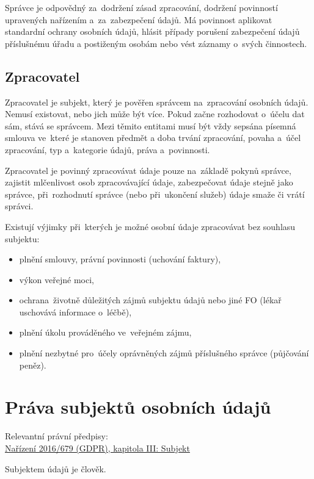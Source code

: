 Správce je odpovědný za~dodržení zásad zpracování, dodržení povinností upravených nařízením a~za~zabezpečení údajů.
Má povinnost aplikovat standardní ochrany osobních údajů, hlásit případy porušení zabezpečení údajů příslušnému úřadu a postiženým osobám nebo vést záznamy o~svých činnostech.


\subsection{Zpracovatel}

Zpracovatel je subjekt, který je pověřen správcem na~zpracování osobních údajů.
Nemusí existovat, nebo jich může být více.
Pokud začne rozhodovat o~účelu dat sám, stává se správcem.
Mezi těmito entitami musí být vždy sepsána písemná smlouva ve~které je stanoven předmět a doba trvání zpracování, povaha a~účel zpracování, typ a~kategorie údajů, práva a~povinnosti.

Zpracovatel je povinný zpracovávat údaje pouze na~základě pokynů správce, zajistit mlčenlivost osob zpracovávající údaje, zabezpečovat údaje stejně jako správce, při~rozhodnutí správce (nebo při~ukončení služeb) údaje smaže či vrátí správci.

Existují výjimky při~kterých je možné osobní údaje zpracovávat bez souhlasu subjektu:
\begin{itemize}
    \item plnění smlouvy, právní povinnosti (uchování faktury),
    \item výkon veřejné moci,
    \item ochrana~životně důležitých zájmů subjektu údajů nebo jiné FO (lékař uschovává informace o~léčbě),
    \item plnění úkolu prováděného ve~veřejném zájmu,
    \item plnění nezbytné pro~účely oprávněných zájmů příslušného správce (půjčování peněz).
\end{itemize}


\clearpage
\section{Práva subjektů osobních údajů}

{}Relevantní právní předpisy:
\\\href{https://eur-lex.europa.eu/legal-content/CS/ALL/?uri=CELEX:32016R0679#d1e2150-1-1
}{Nařízení 2016/679 (GDPR), kapitola III: Subjekt}

Subjektem údajů je člověk.


